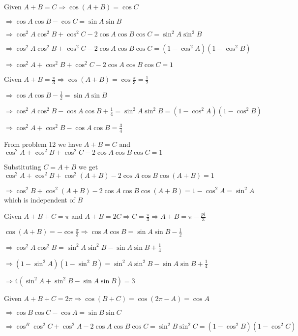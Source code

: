 \item Given $A + B = C \Rightarrow \cos(A + B) = \cos C$

  $\Rightarrow \cos A\cos B - \cos C = \sin A\sin B$

  $\Rightarrow \cos^2A\cos^2B + \cos^2C - 2\cos A\cos B\cos C = \sin^2A\sin^2B$

  $\Rightarrow \cos^2A\cos^2B + \cos^2C - 2\cos A\cos B\cos C = (1 - \cos^2A)(1 - \cos^2B)$

  $\Rightarrow \cos^2A + \cos^2B + \cos^2C - 2\cos A\cos B\cos C = 1$

\item Given $A + B = \frac{\pi}{3} \Rightarrow \cos(A + B) = \cos\frac{\pi}{3} = \frac{1}{2}$

  $\Rightarrow \cos A\cos B - \frac{1}{2} = \sin A\sin B$

  $\Rightarrow \cos^2A\cos^2B - \cos A\cos B + \frac{1}{4} = \sin^2A\sin^2B = (1 - \cos^2A)(1 - \cos^2B)$

  $\Rightarrow \cos^2A + \cos^2B - \cos A\cos B = \frac{3}{4}$

\item From problem 12 we have $A + B = C$ and $\cos^2A + \cos^2B + \cos^2C - 2\cos A\cos B\cos C = 1$

  Substituting $C = A + B$ we get $\cos^2A + \cos^2B + \cos^2(A + B) - 2\cos A\cos B\cos(A + B) = 1$

  $\Rightarrow \cos^2B + \cos^2(A + B) - 2\cos A\cos B\cos(A + B) = 1 - \cos^2A = \sin^2A$ which is independent of
  $B$

\item Given $A + B + C = \pi$ and $A + B = 2C \Rightarrow C = \frac{\pi}{3} \Rightarrow A + B = \pi - \frac{pi}{3}$

  $\cos(A + B) = -\cos\frac{\pi}{3}\Rightarrow \cos A\cos B = \sin A\sin B - \frac{1}{2}$

  $\Rightarrow \cos^2A\cos^2B = \sin^2A\sin^2B - \sin A\sin B + \frac{1}{4}$

  $\Rightarrow (1 - \sin^2A)(1 - \sin^2B) = \sin^2A\sin^2B - \sin A\sin B + \frac{1}{4}$

  $\Rightarrow 4(\sin^2A + \sin^2B - \sin A\sin B) = 3$

\item Given $A + B + C = 2\pi \Rightarrow \cos(B + C) = \cos(2\pi - A) = \cos A$

  $\Rightarrow \cos B\cos C - \cos A = \sin B\sin C$

  $\Rightarrow \cos^B\cos^2C + \cos^2A - 2\cos A\cos B\cos C = \sin^2B\sin^2C = (1 - \cos^2B)(1 - \cos^2C)$

